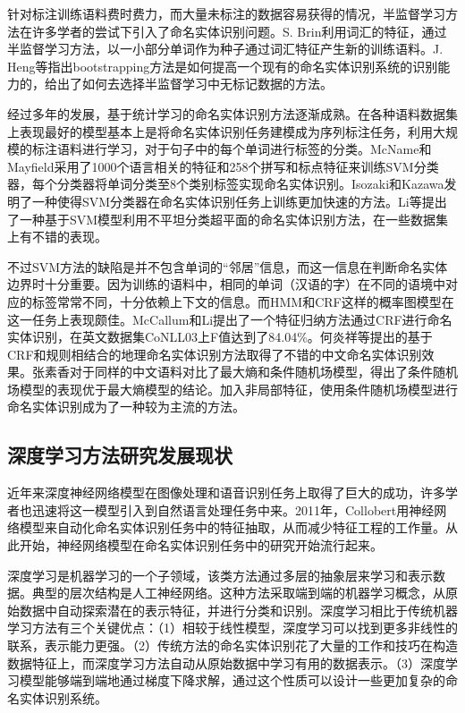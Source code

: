 \documentclass[winfonts,master,oneside,nobackinfo]{njuthesis}
\begin{document}
针对标注训练语料费时费力，而大量未标注的数据容易获得的情况，半监督学习方法在许多学者的尝试下引入了命名实体识别问题。S. Brin\cite{Brin}利用词汇的特征，通过半监督学习方法，以一小部分单词作为种子通过词汇特征产生新的训练语料。J. Heng\cite{Heng}等指出bootstrapping方法是如何提高一个现有的命名实体识别系统的识别能力的，给出了如何去选择半监督学习中无标记数据的方法。

经过多年的发展，基于统计学习的命名实体识别方法逐渐成熟。在各种语料数据集上表现最好的模型基本上是将命名实体识别任务建模成为序列标注任务，利用大规模的标注语料进行学习，对于句子中的每个单词进行标签的分类。McName和Mayfield\cite{McName}采用了1000个语言相关的特征和258个拼写和标点特征来训练SVM分类器，每个分类器将单词分类至8个类别标签实现命名实体识别。Isozaki和Kazawa\cite{Isozki}发明了一种使得SVM分类器在命名实体识别任务上训练更加快速的方法。Li\cite{Li}等提出了一种基于SVM模型利用不平坦分类超平面的命名实体识别方法，在一些数据集上有不错的表现。

不过SVM方法的缺陷是并不包含单词的“邻居”信息，而这一信息在判断命名实体边界时十分重要。因为训练的语料中，相同的单词（汉语的字）在不同的语境中对应的标签常常不同，十分依赖上下文的信息。而HMM和CRF这样的概率图模型在这一任务上表现颇佳。McCallum和Li\cite{McCallum}提出了一个特征归纳方法通过CRF进行命名实体识别，在英文数据集CoNLL03上F值达到了84.04\%。何炎祥等\cite{hyx}提出的基于CRF和规则相结合的地理命名实体识别方法取得了不错的中文命名实体识别效果。张素香\cite{zsx}对于同样的中文语料对比了最大熵和条件随机场模型，得出了条件随机场模型的表现优于最大熵模型的结论。加入非局部特征，使用条件随机场模型进行命名实体识别成为了一种较为主流的方法。

\subsection{深度学习方法研究发展现状}
近年来深度神经网络模型在图像处理和语音识别任务上取得了巨大的成功，许多学者也迅速将这一模型引入到自然语言处理任务中来。2011年，Collobert\cite{Collobert}用神经网络模型来自动化命名实体识别任务中的特征抽取，从而减少特征工程的工作量。从此开始，神经网络模型在命名实体识别任务中的研究开始流行起来。

深度学习是机器学习的一个子领域，该类方法通过多层的抽象层来学习和表示数据。典型的层次结构是人工神经网络。这种方法采取端到端的机器学习概念，从原始数据中自动探索潜在的表示特征，并进行分类和识别。深度学习相比于传统机器学习方法有三个关键优点：（1）相较于线性模型，深度学习可以找到更多非线性的联系，表示能力更强。（2）传统方法的命名实体识别花了大量的工作和技巧在构造数据特征上，而深度学习方法自动从原始数据中学习有用的数据表示。（3）深度学习模型能够端到端地通过梯度下降求解，通过这个性质可以设计一些更加复杂的命名实体识别系统。
\end{document}

